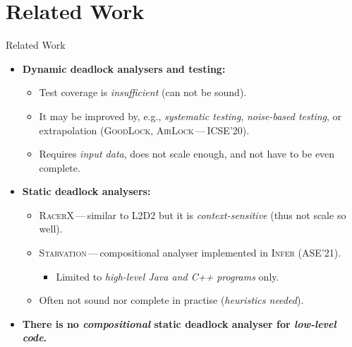 \documentclass[10pt, xcolor=pdflatex, hyperref={unicode}, aspectratio=169]{beamer}
\begin{document}


\section{Related Work}
\begin{frame}{Related Work}
    \begin{itemize}\setlength\itemsep{2em}
        \item \textbf{Dynamic deadlock analysers and testing:}
            \medskip
            \begin{itemize}\setlength\itemsep{.5em}
                \item \alert{Test coverage} is \emph{insufficient} (can not be sound).

                \item It may be improved by, e.g., \emph{systematic testing}, \emph{noise-based testing}, or \alert{extrapolation} (\textsc{GoodLock}, \textsc{AirLock}\,---\,ICSE'20).

                \item Requires \emph{input data}, \alert{does not scale enough}, and not have to be even complete.
            \end{itemize}

        \item \textbf{Static deadlock analysers:}
            \medskip
            \begin{itemize}\setlength\itemsep{.5em}
                \item \textsc{RacerX}\,---\,similar to \textsc{L2D2} but it is \emph{context-sensitive} (thus \alert{not scale so well}).

                \item \textsc{Starvation}\,---\,\alert{compositional} analyser implemented in \textsc{Infer} (ASE'21).
                    \begin{itemize}
                        \item Limited to \emph{high-level Java and C++ programs} only.
                    \end{itemize}

                \item Often not sound nor complete in practise (\emph{heuristics needed}).
            \end{itemize}

        \item \textbf{There is \alert{no} \emph{compositional} static deadlock analyser for \emph{low-level code}.}
    \end{itemize}
\end{frame}
\end{document}

